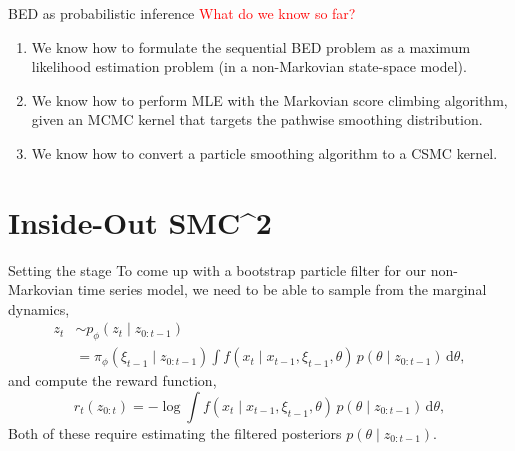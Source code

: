 \documentclass[10pt, aspectratio=1610]{beamer}
\newcommand{\dd}{\mathrm{d}}
\begin{document}
    \begin{frame}{BED as probabilistic inference}
      \textcolor{red}{\large What do we know so far?}\vspace{0.1cm}
      \begin{enumerate}
        \item<2-> We know how to formulate the sequential BED problem as a maximum likelihood estimation problem (in a non-Markovian state-space model).
        \item<3-> We know how to perform MLE with the Markovian score climbing algorithm, given an MCMC kernel that targets the pathwise smoothing distribution.
        \item<4-> We know how to convert a particle smoothing algorithm to a CSMC kernel.
      \end{enumerate}

      \vspace{0.3cm}
    \end{frame}

  \section{Inside-Out SMC^2}
    \begin{frame}{Setting the stage}
      To come up with a bootstrap particle filter for our non-Markovian time series model, we need to be able to sample from the marginal dynamics,
      \begin{align}
        z_t &\sim p_\phi(z_t \mid z_{0:t-1}) \\
        &= \pi_\phi(\xi_{t-1} \mid z_{0:t-1}) \int f(x_t \mid x_{t-1}, \xi_{t-1}, \theta) \, p(\theta \mid z_{0:t-1}) \, \dd \theta,
      \end{align}
      and compute the reward function,
      \begin{equation}
        r_t(z_{0:t}) = - \log \int f(x_t \mid x_{t-1}, \xi_{t-1}, \theta) \, p(\theta \mid z_{0:t-1}) \, \dd \theta,
      \end{equation}
      \pause
      Both of these require estimating the filtered posteriors $p(\theta \mid z_{0:t-1})$.
    \end{frame}
\end{document}
